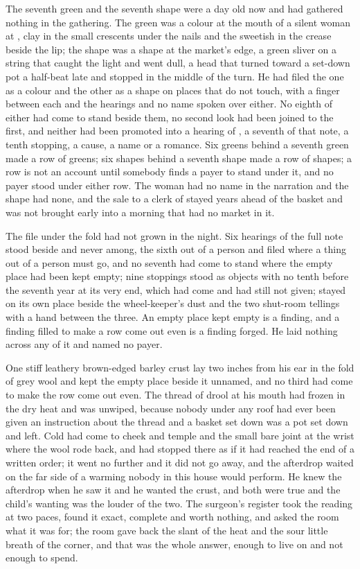 The seventh green and the seventh shape were a day old now and had gathered nothing in the gathering. The green was a colour at the mouth of a silent woman at , clay in the small crescents under the nails and the sweetish  in the crease beside the lip; the shape was a shape at the market's edge, a green sliver on a string that caught the light and went dull, a head that turned toward a set-down pot a half-beat late and stopped in the middle of the turn. He had filed the one as a colour and the other as a shape on places that do not touch, with a finger between each and the hearings and no name spoken over either. No eighth of either had come to stand beside them, no second look had been joined to the first, and neither had been promoted into a hearing of , a seventh of that note, a tenth stopping, a cause, a name or a romance. Six greens behind a seventh green made a row of greens; six shapes behind a seventh shape made a row of shapes; a row is not an account until somebody finds a payer to stand under it, and no payer stood under either row. The woman had no name in the narration and the shape had none, and the sale to a clerk of  stayed years ahead of the basket and was not brought early into a morning that had no market in it.

The file under the fold had not grown in the night. Six hearings of the full note stood beside and never among, the sixth out of a person and filed where a thing out of a person must go, and no seventh had come to stand where the empty place had been kept empty; nine stoppings stood as objects with no tenth before the seventh year at its very end, which had come and had still not given;  stayed on its own place beside the wheel-keeper's dust and the two shut-room tellings with a hand between the three. An empty place kept empty is a finding, and a finding filled to make a row come out even is a finding forged. He laid nothing across any of it and named no payer.

One stiff leathery brown-edged barley crust lay two inches from his ear in the fold of grey wool and kept the empty place beside it unnamed, and no third had come to make the row come out even. The thread of drool at his mouth had frozen in the dry heat and was unwiped, because nobody under any roof had ever been given an instruction about the thread and a basket set down was a pot set down and left. Cold had come to cheek and temple and the small bare joint at the wrist where the wool rode back, and had stopped there as if it had reached the end of a written order; it went no further and it did not go away, and the afterdrop waited on the far side of a warming nobody in this house would perform. He knew the afterdrop when he saw it and he wanted the crust, and both were true and the child's wanting was the louder of the two. The surgeon's register took the reading at two paces, found it exact, complete and worth nothing, and asked the room what it was for; the room gave back the slant of the heat and the sour little breath of the corner, and that was the whole answer, enough to live on and not enough to spend.

